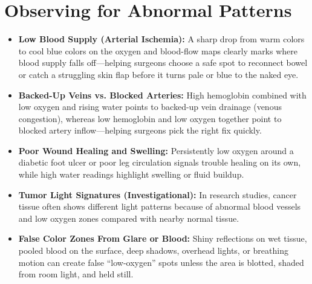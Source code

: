 \section{Observing for Abnormal Patterns}
\begin{itemize}
    \item \textbf{Low Blood Supply (Arterial Ischemia):} A sharp drop from warm colors to cool blue colors on the oxygen and blood-flow maps clearly marks where blood supply falls off---helping surgeons choose a safe spot to reconnect bowel or catch a struggling skin flap before it turns pale or blue to the naked eye.
    \item \textbf{Backed-Up Veins vs. Blocked Arteries:} High hemoglobin combined with low oxygen and rising water points to backed-up vein drainage (venous congestion), whereas low hemoglobin and low oxygen together point to blocked artery inflow---helping surgeons pick the right fix quickly.
    \item \textbf{Poor Wound Healing and Swelling:} Persistently low oxygen around a diabetic foot ulcer or poor leg circulation signals trouble healing on its own, while high water readings highlight swelling or fluid buildup.
    \item \textbf{Tumor Light Signatures (Investigational):} In research studies, cancer tissue often shows different light patterns because of abnormal blood vessels and low oxygen zones compared with nearby normal tissue.
    \item \textbf{False Color Zones From Glare or Blood:} Shiny reflections on wet tissue, pooled blood on the surface, deep shadows, overhead lights, or breathing motion can create false ``low-oxygen'' spots unless the area is blotted, shaded from room light, and held still.
\end{itemize}

